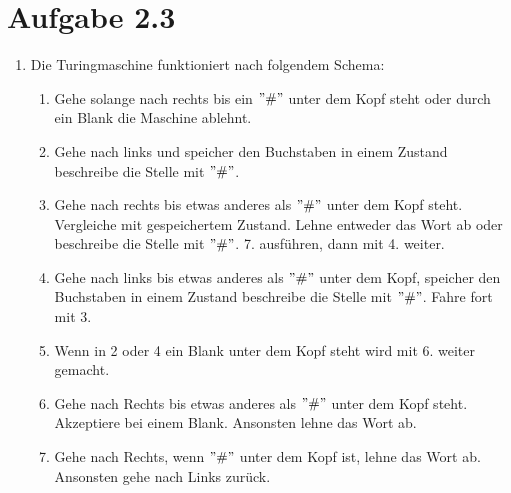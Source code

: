 \documentclass{article}
\begin{document}
	\section[a 2.3]{Aufgabe 2.3}
	\begin{enumerate} [label=\alph*.]
		\item Die Turingmaschine funktioniert nach folgendem Schema:\\
		\begin{enumerate}[label=\arabic*.]
			\item Gehe solange nach rechts bis ein $"\#"$ unter dem Kopf steht oder durch ein Blank die Maschine ablehnt.
			\item Gehe nach links und speicher den Buchstaben in einem Zustand beschreibe die Stelle mit $"\#"$.
			\item Gehe nach rechts bis etwas anderes als $"\#"$ unter dem Kopf steht. Vergleiche mit gespeichertem Zustand. Lehne entweder das Wort ab oder beschreibe die Stelle mit $"\#"$. 7. ausführen, dann mit 4. weiter.
			\item Gehe nach links bis etwas anderes als $"\#"$ unter dem Kopf, speicher den Buchstaben in einem Zustand beschreibe die Stelle mit $"\#"$. Fahre fort mit 3.
			\item Wenn in 2 oder 4 ein Blank unter dem Kopf steht wird mit 6. weiter gemacht.
			\item Gehe nach Rechts bis etwas anderes als $"\#"$ unter dem Kopf steht. Akzeptiere bei einem Blank. Ansonsten lehne das Wort ab.
			\item Gehe nach Rechts, wenn $"\#"$ unter dem Kopf ist, lehne das Wort ab. Ansonsten gehe nach Links zurück.
			\end{enumerate}
	\end{enumerate}
\end{document}
